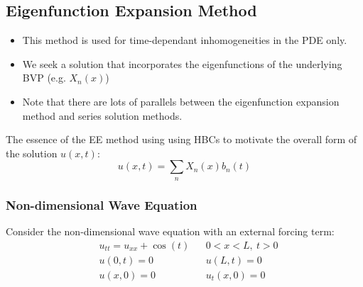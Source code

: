 \documentclass[12pt]{article}
\begin{document}
\subsection{Eigenfunction Expansion Method}
\begin{itemize}
    \item This method is used for time-dependant inhomogeneities in the PDE only.
    \item We seek a solution that incorporates the eigenfunctions of the underlying BVP (e.g. \(X_n(x)\))
    \item Note that there are lots of parallels between the eigenfunction expansion method and series solution methods.
\end{itemize}
The essence of the EE method using using HBCs to motivate the overall form of the solution \(u(x,t)\):
\[u(x,t)=\sum_nX_n(x)b_n(t)\]
\subsubsection{Non-dimensional Wave Equation}
Consider the non-dimensional wave equation with an external forcing term:
\begin{align*}
    &u_{tt}=u_{xx}+\cos(t)&&0<x<L,\ t>0 \\
    &u(0,t)=0 && u(L,t)=0 \\
    &u(x,0)=0 && u_t(x,0)=0
\end{align*}
\end{document}
